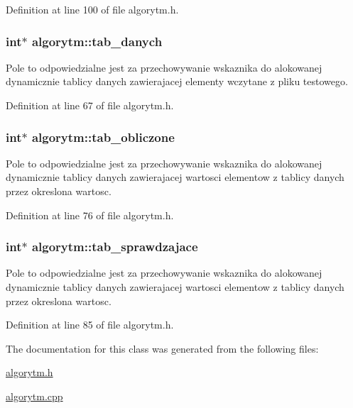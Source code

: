 Definition at line 100 of file algorytm.\-h.

\hypertarget{classalgorytm_a7bbde139599763bf8b36d21c6f314a1a}{
\subsubsection[{tab\-\_\-danych}]{\setlength{\rightskip}{0pt plus 5cm}int$\ast$ algorytm\-::tab\-\_\-danych}}\label{classalgorytm_a7bbde139599763bf8b36d21c6f314a1a}
Pole to odpowiedzialne jest za przechowywanie wskaznika do alokowanej dynamicznie tablicy danych zawierajacej elementy wczytane z pliku testowego. 

Definition at line 67 of file algorytm.\-h.

\hypertarget{classalgorytm_a02dd561c7411091f78e0d058bb1485df}{
\subsubsection[{tab\-\_\-obliczone}]{\setlength{\rightskip}{0pt plus 5cm}int$\ast$ algorytm\-::tab\-\_\-obliczone}}\label{classalgorytm_a02dd561c7411091f78e0d058bb1485df}
Pole to odpowiedzialne jest za przechowywanie wskaznika do alokowanej dynamicznie tablicy danych zawierajacej wartosci elementow z tablicy danych przez okreslona wartosc. 

Definition at line 76 of file algorytm.\-h.

\hypertarget{classalgorytm_a67ec91f63071c85dea86bed4b77d5239}{
\subsubsection[{tab\-\_\-sprawdzajace}]{\setlength{\rightskip}{0pt plus 5cm}int$\ast$ algorytm\-::tab\-\_\-sprawdzajace}}\label{classalgorytm_a67ec91f63071c85dea86bed4b77d5239}
Pole to odpowiedzialne jest za przechowywanie wskaznika do alokowanej dynamicznie tablicy danych zawierajacej wartosci elementow z tablicy danych przez okreslona wartosc. 

Definition at line 85 of file algorytm.\-h.



The documentation for this class was generated from the following files\-:\begin{DoxyCompactItemize}
\item 
\hyperlink{algorytm_8h}{algorytm.\-h}\item 
\hyperlink{algorytm_8cpp}{algorytm.\-cpp}\end{DoxyCompactItemize}
